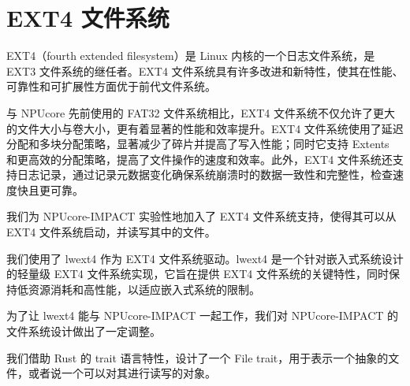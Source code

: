 \section{EXT4 文件系统}

EXT4（fourth extended filesystem）是 Linux 内核的一个日志文件系统，是 EXT3 文件系统的继任者。EXT4 文件系统具有许多改进和新特性，使其在性能、可靠性和可扩展性方面优于前代文件系统。

与 NPUcore 先前使用的 FAT32 文件系统相比，EXT4 文件系统不仅允许了更大的文件大小与卷大小，更有着显著的性能和效率提升。EXT4 文件系统使用了延迟分配和多块分配策略，显著减少了碎片并提高了写入性能；同时它支持 Extents 和更高效的分配策略，提高了文件操作的速度和效率。此外，EXT4 文件系统还支持日志记录，通过记录元数据变化确保系统崩溃时的数据一致性和完整性，检查速度快且更可靠。

我们为 NPUcore-IMPACT 实验性地加入了 EXT4 文件系统支持，使得其可以从 EXT4 文件系统启动，并读写其中的文件。

我们使用了 lwext4 作为 EXT4 文件系统驱动。lwext4 是一个针对嵌入式系统设计的轻量级 EXT4 文件系统实现，它旨在提供 EXT4 文件系统的关键特性，同时保持低资源消耗和高性能，以适应嵌入式系统的限制。

为了让 lwext4 能与 NPUcore-IMPACT 一起工作，我们对 NPUcore-IMPACT 的文件系统设计做出了一定调整。

我们借助 Rust 的 trait 语言特性，设计了一个 File trait，用于表示一个抽象的文件，或者说一个可以对其进行读写的对象。

